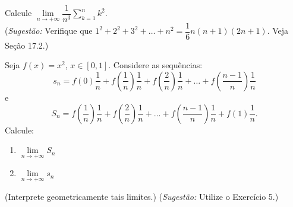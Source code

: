 \begin{exercicio}[5]
Calcule $\lim\limits_{n \to +\infty} \dfrac{1}{n^3}\sum\limits_{k=1}^n k^2$.\\
(\textit{Sugestão:} Verifique que $1^2 + 2^2 + 3^2 + \dots + n^2 = \dfrac{1}{6}n(n + 1)(2n + 1)$. Veja Seção 17.2.)
\end{exercicio}

\begin{exercicio}[6]
Seja $f(x) = x^2$, $x \in [0, 1]$. Considere as sequências:
\[
s_n = f(0)\dfrac{1}{n} + f\!\left(\dfrac{1}{n}\right)\dfrac{1}{n} + f\!\left(\dfrac{2}{n}\right)\dfrac{1}{n} + \dots + f\!\left(\dfrac{n - 1}{n}\right)\dfrac{1}{n}
\]
e
\[
S_n = f\!\left(\dfrac{1}{n}\right)\dfrac{1}{n} + f\!\left(\dfrac{2}{n}\right)\dfrac{1}{n} + \dots + f\!\left(\dfrac{n - 1}{n}\right)\dfrac{1}{n} + f(1)\dfrac{1}{n}.
\]
Calcule:
\begin{enumerate}[label=\alph*)]
    \item $\lim\limits_{n \to +\infty} S_n$
    \item $\lim\limits_{n \to +\infty} s_n$
\end{enumerate}
(Interprete geometricamente tais limites.) (\textit{Sugestão:} Utilize o Exercício 5.)
\end{exercicio}

